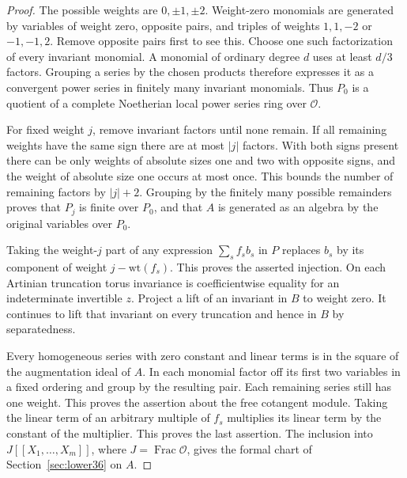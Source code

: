 \documentclass[a4paper,11pt]{article}
\theoremstyle{definition}
\theoremstyle{remark}
\numberwithin{equation}{section}
\newcommand{\OO}{\mathcal O}
\begin{document}
\begin{proof}
The possible weights are \(0,\pm1,\pm2\). Weight-zero monomials
are generated by variables of weight zero, opposite pairs, and
triples of weights \(1,1,-2\) or \(-1,-1,2\). Remove opposite
pairs first to see this. Choose one such factorization of every
invariant monomial. A monomial of ordinary degree \(d\) uses at
least \(d/3\) factors. Grouping a series by the chosen products
therefore expresses it as a convergent power series in finitely
many invariant monomials. Thus \(P_0\) is a quotient of a
complete Noetherian local power series ring over \(\OO\).

For fixed weight \(j\), remove invariant factors until none
remain. If all remaining weights have the same sign there are
at most \(|j|\) factors. With both signs present there can be
only weights of absolute sizes one and two with opposite signs,
and the weight of absolute size one occurs at most once.
This bounds the number of remaining factors by \(|j|+2\).
Grouping by the finitely many possible remainders proves that
\(P_j\) is finite over \(P_0\), and that \(A\) is generated
as an algebra by the original variables over \(P_0\).

Taking the weight-\(j\) part of any expression
\(\sum_s f_s b_s\) in \(P\) replaces \(b_s\) by its component
of weight \(j-\mathrm{wt}(f_s)\). This proves the asserted
injection. On each Artinian truncation torus invariance is
coefficientwise equality for an indeterminate invertible \(z\).
Project a lift of an invariant in \(B\) to weight zero. It
continues to lift that invariant on every truncation and hence
in \(B\) by separatedness.

Every homogeneous series with zero constant and linear terms is in
the square of the augmentation ideal of \(A\). In each monomial
factor off its first two variables in a fixed ordering and group
by the resulting pair. Each remaining series still has one weight.
This proves the assertion about the free cotangent module.
Taking the linear term of an arbitrary multiple of \(f_s\)
multiplies its linear term by the constant of the multiplier.
This proves the last assertion. The inclusion into
\(J[[X_1,\ldots,X_m]]\), where \(J=\operatorname{Frac}\OO\),
gives the formal chart of Section~\ref{sec:lower36} on \(A\).
\end{proof}
\end{document}
